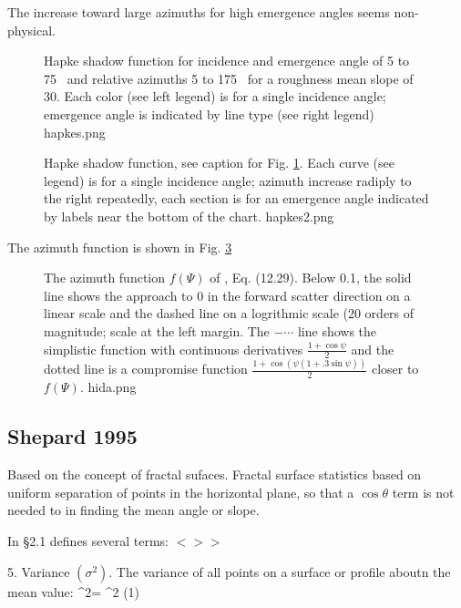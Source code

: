 \documentclass{article}
\newcommand{\qeq}{\hspace{25.mm}} %
\newcommand{\bq}{$ < \! > \!   \! >$ } %
\begin{document}
The increase toward large azimuths for high emergence angles seems non-physical.

\begin{figure}[!ht] 
\caption[Hapke shadow function]{Hapke shadow function for incidence and
  emergence angle of 5 to 75\qd~ and relative azimuths 5 to 175\qd~ for a
  roughness mean slope of 30\qd. Each color (see left legend) is for a single
  incidence angle; emergence angle is indicated by line type (see right legend)
\label{hapkes}  hapkes.png  }
\end{figure} 

\begin{figure}[!ht] 
\caption[Hapke shadow function]{Hapke shadow function, see caption for
  Fig. \ref{hapkes}. Each curve (see legend) is for a single incidence angle;
  azimuth increase radiply to the right repeatedly, each section is for an
  emergence angle indicated by labels near the bottom of the chart.
\label{hapkes2}  hapkes2.png  }
\end{figure} 

The azimuth function is shown in Fig.  \ref{hida}
\begin{figure}[!ht] 
\caption[Azimuth functions]{The azimuth function $f(\Psi)$ of ,
  Eq. (12.29).  Below 0.1, the solid line shows the approach to 0 in the forward
  scatter direction on a linear scale and the dashed line on a logrithmic scale
  (20 orders of magnitude; scale at the left margin. The $-\cdots$ line shows
  the simplistic function with continuous derivatives $\frac{1+ \cos \psi}{2}$
  and the dotted line is a compromise function $\frac{1+ \cos (\psi (1+.3 \sin
    \psi)) }{2}$ closer to $f(\Psi)$. \label{hida} hida.png }
\end{figure} 

\subsection{Shepard 1995} %

Based on the concept of fractal sufaces.  
Fractal surface statistics based on uniform separation of points in the
horizontal plane, so that a $\cos \theta $ term is not needed to in finding the
mean angle or slope.

 In \S 2.1 defines several terms: \bq

5. Variance $( \sigma^2 )$. The variance of all points on a surface or profile aboutn the mean value: 
\qb \sigma^2= \langle [ z- \overline{z} ]^2 \rangle \qeq (1) \qe
\end{document}
